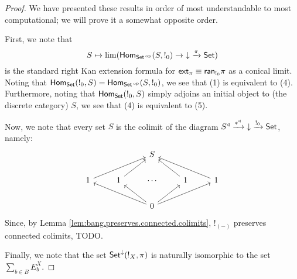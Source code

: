 \begin{proof}
We have presented these results in order of most understandable to most
computational; we will prove it a somewhat opposite order.

First, we note that 
$$S \mapsto \lim(\operatorname{\mathsf{Hom}}_{\operatorname{\mathsf{{Set}}}\operatorname{^\textnormal{op}}}(S, !_0) \to \mathbin{\downarrow} \xrightarrow{\pi} \operatorname{\mathsf{{Set}}})$$
is the standard right Kan extension formula for $\operatorname{\mathsf{{ext}}}_{\pi} \equiv
\mathsf{{ran}}_{!_0} \pi$ as a conical limit. Noting that $\operatorname{\mathsf{Hom}}_{\operatorname{\mathsf{{Set}}}}(!_0, S) = \operatorname{\mathsf{Hom}}_{\operatorname{\mathsf{{Set}}}\operatorname{^\textnormal{op}}}(S,
!_0)$, we see that (1) is equivalent to (4). Furthermore, noting that
$\operatorname{\mathsf{Hom}}_{\operatorname{\mathsf{{Set}}}}(!_0, S)$ simply adjoins an initial object to (the discrete
category) $S$, we see that (4) is equivalent to (5).

Now, we note that every set $S$ is the colimit of the diagram $S^{\triangleleft}
\xrightarrow{\ast^{\triangleleft}}\mathbin{\downarrow} \xrightarrow{!_0} \operatorname{\mathsf{{Set}}}$, namely:
\[
\begin{tikzcd}
              &              & S                                               &              &               \\
1 \arrow[rru] & 1 \arrow[ru] & \cdots                                          & 1 \arrow[lu] & 1 \arrow[llu] \\
              &              & 0 \arrow[llu] \arrow[lu] \arrow[ru] \arrow[rru] &              &              
\end{tikzcd}
\]
Since, by Lemma \ref{lem:bang.preserves.connected.colimits}, $!_{(-)}$
preserves connected colimits, {\color{red} TODO}.

Finally, we note that the set $\operatorname{\mathsf{{Set}}}^{\mathbin{\downarrow}}(!_X, \pi)$ is naturally
isomorphic to the set $\sum_{b \in B} E_b^X$.
\end{proof}

